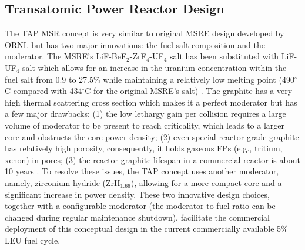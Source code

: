 \documentclass{anstrans}
\begin{document}
\subsection{Transatomic Power Reactor Design}
The \gls{TAP} \gls{MSR} concept is very similar to original \gls{MSRE} design 
developed 
by \gls{ORNL} \cite{haubenreich_experience_1970} but has two major  
innovations: 
the fuel salt composition and the moderator. The \gls{MSRE}'s 
LiF-BeF$_2$-ZrF$_4$-UF$_4$ salt has been substituted with LiF-UF$_4$ salt 
which 
allows for an increase in the uranium concentration within the fuel salt from 
0.9 to 
27.5\% while maintaining a relatively low melting point (490$^{\circ}$C 
compared 
with 434$^{\circ}$C for the original \gls{MSRE}'s salt) 
\cite{betzler_assessment_2017}. The graphite has a very high 
thermal scattering cross section which makes it a perfect moderator but has 
a few major drawbacks: 
(1) the low lethargy gain per collision requires a large volume of moderator 
to be present to reach criticality, which leads to a larger core and obstructs 
the core power density; (2) even special 
reactor-grade graphite has relatively high porosity, consequently, it holds
gaseous \glspl{FP} 
(e.g., tritium, xenon) in pores; (3) the reactor graphite lifespan in a 
commercial 
reactor is about 10 years \cite{robertson_conceptual_1971}. To resolve these 
issues, the \gls{TAP} concept uses another 
moderator, namely, zirconium hydride (ZrH$_{1.66}$), allowing for a more 
compact core and a 
significant increase in power density. These two innovative design choices,  
together with a configurable moderator 
(the moderator-to-fuel ratio can be changed during regular maintenance 
shutdown), 
facilitate the commercial deployment of this conceptual design in the current 
commercially available 5\% \gls{LEU} fuel cycle. 
\end{document}
